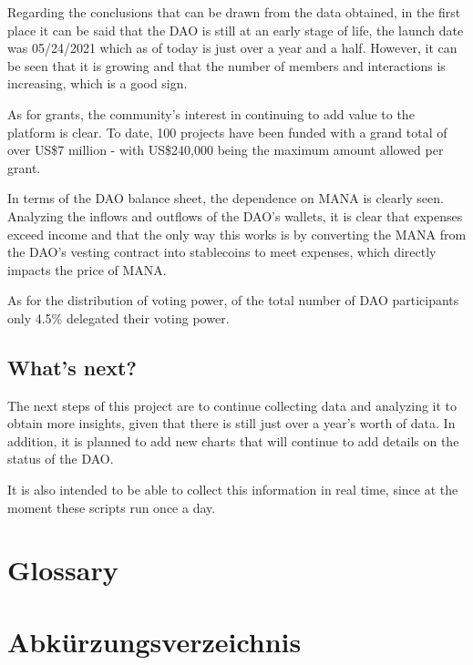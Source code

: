 \documentclass[MSE,Master,english]{twbook}%
\providecommand\listacroname{}
\renewcommand\listacroname{List of Abbreviations}
\renewcommand\listacroname{Abkürzungsverzeichnis}
\newcommand{\listofcode}{\phantomsection\lstlistoflistings}
\begin{document}
Regarding the conclusions that can be drawn from the data obtained, in the first place it can be said that the DAO is still at an early stage of life, the launch date was 05/24/2021 which as of today is just over a year and a half. However, it can be seen that it is growing and that the number of members and interactions is increasing, which is a good sign.

As for grants, the community's interest in continuing to add value to the platform is clear. To date, 100 projects have been funded with a grand total of over US\$7 million - with US\$240,000 being the maximum amount allowed per grant.

In terms of the DAO balance sheet, the dependence on MANA is clearly seen. Analyzing the inflows and outflows of the DAO's wallets, it is clear that expenses exceed income and that the only way this works is by converting the MANA from the DAO's vesting contract into stablecoins to meet expenses, which directly impacts the price of MANA.

As for the distribution of voting power, of the total number of DAO participants only 4.5\% delegated their voting power.

\section{What's next?}
The next steps of this project are to continue collecting data and analyzing it to obtain more insights, given that there is still just over a year's worth of data. In addition, it is planned to add new charts that will continue to add details on the status of the DAO. 

It is also intended to be able to collect this information in real time, since at the moment these scripts run once a day.

\toComplete

\chapter{Glossary}
\printnoidxglossaries
\clearpage

\printbibliography
\clearpage

\listoffigures
\clearpage

\listoftables
\clearpage

\listofcode
\clearpage

\addcontentsline{toc}{chapter}{\listacroname}
\chapter*{\listacroname}
\begin{acronym}
\end{acronym}

\clearpage
\appendix
\end{document}
